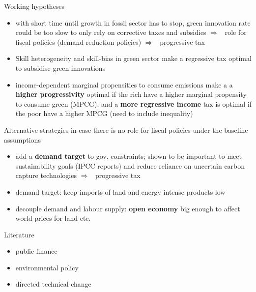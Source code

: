 \documentclass[11pt,aspectratio=169]{beamer}
\newcommand{\ar}{$\Rightarrow$ \ }
\begin{document}
\begin{frame}{Working hypotheses}	
	\begin{itemize}
		\item<+-> with short time until growth in fossil sector has to stop, green innovation rate could be too slow to only rely on corrective taxes and subsidies \ar role for fiscal policies (demand reduction policies) \ar progressive tax
		\vspace{3mm}
		\item<+-> Skill heterogeneity and skill-bias in green sector make a regressive tax optimal to subsidise green innovations
		\vspace{3mm}
		\item<+-> income-dependent marginal propensities to consume emissions make a a \textbf{higher progressivity} optimal if the rich have a higher marginal propensity to consume green (MPCG); and a \textbf{more regressive income} tax is optimal if the poor have a higher MPCG (need to include inequality) 
	\end{itemize}
\end{frame}

\begin{frame}{Alternative strategies}
	in case there is no role for fiscal policies under the baseline assumptions
\begin{itemize}
	\item<+-> add a \textbf{demand target} to gov. constraints;  shown to be important to meet sustainability goals (IPCC reports) and reduce reliance on uncertain carbon capture technologies \ar progressive tax 
	\item<+-> demand target: keep imports of land and energy intense products low 
	\item decouple demand and labour supply: \textbf{open economy} big enough to affect world prices for land etc. 
\end{itemize}
\end{frame}

\begin{frame}{Literature}
	\begin{itemize}
		\item public finance
		\item environmental policy
		\item directed technical change
	\end{itemize}
\end{frame}
\end{document}
